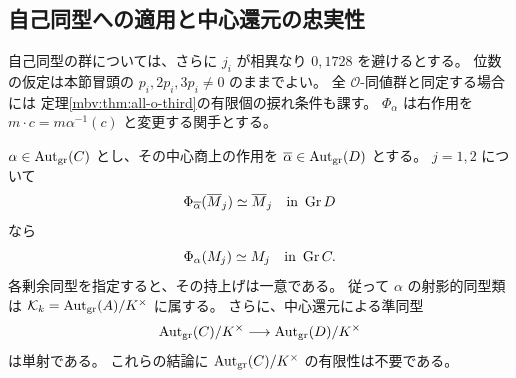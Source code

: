 \subsection{自己同型への適用と中心還元の忠実性}

自己同型の群については、さらに $j_i$ が相異なり $0,1728$ を避けるとする。
位数の仮定は本節冒頭の $p_i,2p_i,3p_i\ne0$ のままでよい。
全 $\mathcal O$-同値群と同定する場合には
定理\ref{mbv:thm:all-o-third}の有限個の捩れ条件も課す。
$\Phi_\alpha$ は右作用を
$m\cdot c=m\alpha^{-1}(c)$ と変更する関手とする。

\begin{theorem}[中心還元からの次数一軌道の認識]
\label{mbcr:thm:reduction-rigidity}
$\alpha\in\operatorname{Aut}_{\mathrm{gr}}(C)$ とし、その中心商上の作用を
$\overline\alpha\in\operatorname{Aut}_{\mathrm{gr}}(D)$ とする。
$j=1,2$ について
\[
 \Phi_{\overline\alpha}(\overline M_j)\simeq\overline M_j
 \quad\text{in }\operatorname{Gr} D
\]
なら
\[
 \Phi_\alpha(M_j)\simeq M_j\quad\text{in }\operatorname{Gr} C .
\]
各剰余同型を指定すると、その持上げは一意である。
従って $\alpha$ の射影的同型類は
$\mathcal K_k=\operatorname{Aut}_{\mathrm{gr}}(A)/K^\times$ に属する。
さらに、中心還元による準同型
\begin{equation}\label{mbcr:eq:faithful-reduction}
 \operatorname{Aut}_{\mathrm{gr}}(C)/K^\times
 \longrightarrow \operatorname{Aut}_{\mathrm{gr}}(D)/K^\times
\end{equation}
は単射である。
これらの結論に $\operatorname{Aut}_{\mathrm{gr}}(C)/K^\times$ の有限性は不要である。
\end{theorem}
